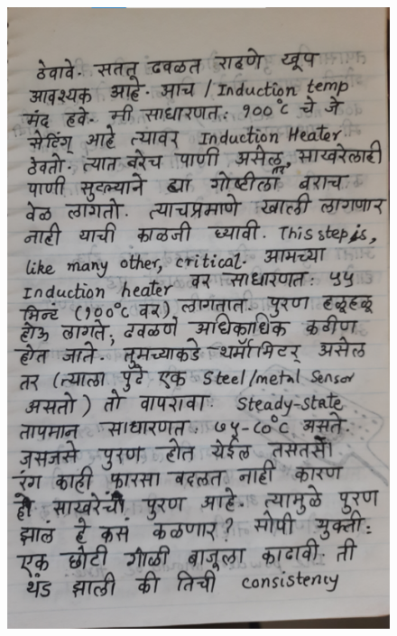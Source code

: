 \documentclass[17pt]{extarticle}  %
\begin{document}
\begin{figure}[h!]
    \centering
    \includegraphics{img/03-s.png}
\end{figure}
\end{document}
